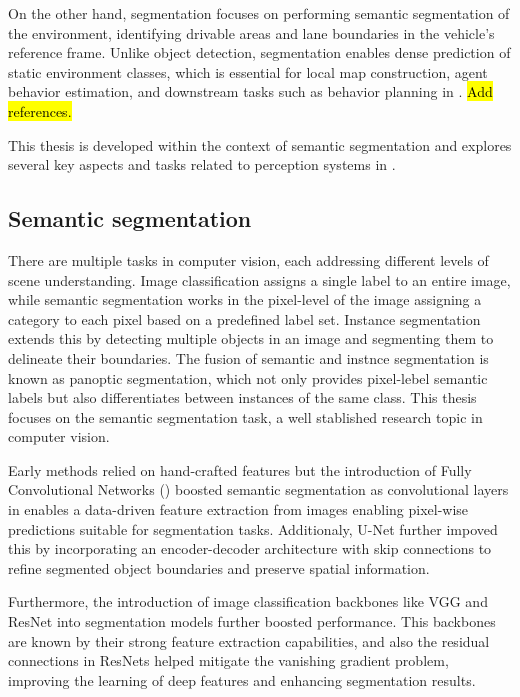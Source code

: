 On the other hand,  segmentation focuses on performing semantic segmentation of the environment, identifying drivable areas and lane boundaries in the vehicle's reference frame. Unlike object detection,  segmentation enables dense prediction of static environment classes, which is essential for local map construction, agent behavior estimation, and downstream tasks such as behavior planning in . \hl{Add references.}

This thesis is developed within the context of  semantic segmentation and explores several key aspects and tasks related to perception systems in .

\subsection{Semantic segmentation} 
\label{sec:sota_semantic_segmentation}

There are multiple tasks in computer vision, each addressing different levels of scene understanding. Image classification assigns a single label to an entire image, while semantic segmentation works in the pixel-level of the image assigning a category to each pixel based on a predefined label set. Instance segmentation extends this by detecting multiple objects in an image and segmenting them to delineate their boundaries. The fusion of semantic and instnce segmentation is known as panoptic segmentation, which not only provides pixel-lebel semantic labels but also differentiates between instances of the same class. This thesis focuses on the semantic segmentation task, a well stablished research topic in computer vision.

Early methods relied on hand-crafted features but the introduction of Fully Convolutional Networks () \cite{FCNs} boosted semantic segmentation as convolutional layers in  enables a data-driven feature extraction from images enabling pixel-wise predictions suitable for segmentation tasks. Additionaly, U-Net \cite{u_net} further impoved this by incorporating an encoder-decoder architecture with skip connections to refine segmented object boundaries and preserve spatial information.

Furthermore, the introduction of image classification backbones like VGG \cite{VGG} and ResNet \cite{ResNet} into segmentation models further boosted performance. This backbones are known by their strong feature extraction capabilities, and also the residual connections in ResNets helped mitigate the vanishing gradient problem, improving the learning of deep features and enhancing segmentation results.

